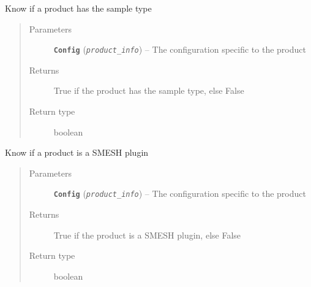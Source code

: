 \documentclass[a4paper,10pt,english]{sphinxmanual}
\begin{document}
\begin{fulllineitems}
\label{commands/apidoc/src:src.product.product_is_sample}
Know if a product has the sample type
\begin{quote}\begin{description}
\item[{Parameters}] \leavevmode
\textbf{\texttt{Config}} (\emph{\texttt{product\_info}}) -- The configuration specific to 
the product

\item[{Returns}] \leavevmode
True if the product has the sample type, else False

\item[{Return type}] \leavevmode
boolean

\end{description}\end{quote}

\end{fulllineitems}


\begin{fulllineitems}
\label{commands/apidoc/src:src.product.product_is_smesh_plugin}
Know if a product is a SMESH plugin
\begin{quote}\begin{description}
\item[{Parameters}] \leavevmode
\textbf{\texttt{Config}} (\emph{\texttt{product\_info}}) -- The configuration specific to 
the product

\item[{Returns}] \leavevmode
True if the product is a SMESH plugin, else False

\item[{Return type}] \leavevmode
boolean

\end{description}\end{quote}

\end{fulllineitems}

\end{document}

